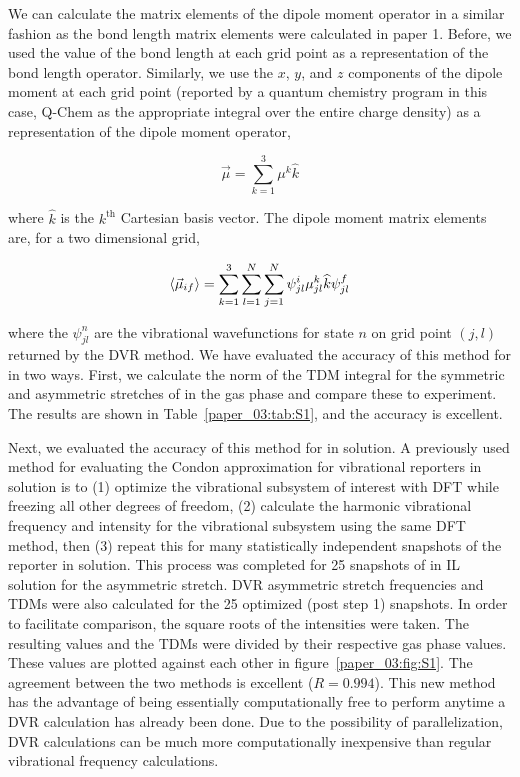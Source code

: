 We can calculate the matrix elements of the dipole moment operator in a similar fashion as the bond length matrix elements were calculated in paper 1. Before, we used the value of the bond length at each grid point as a representation of the bond length operator. Similarly, we use the \(x\), \(y\), and \(z\) components of the dipole moment at each grid point (reported by a quantum chemistry program \textemdash{} in this case, Q-Chem\cite{Shao2015} \textemdash{} as the appropriate integral over the entire charge density) as a representation of the dipole moment operator,

\begin{equation}
  \label{paper_03:eq:S2}
  \vec{\mu} = \sum_{k = 1}^{3} \mu^k \widehat{k}
\end{equation}

where \(\widehat{k}\) is the \(k^{\text{th}}\) Cartesian basis vector. The dipole moment matrix elements are, for a two dimensional grid,

\begin{equation}
  \label{paper_03:eq:S3}
  \Braket{ \vec{\mu}_{if} } = \sum_{k = 1}^{3} \sum_{l = 1}^{N} \sum_{j = 1}^{N} \psi_{jl}^{i} \mu_{jl}^{k} \widehat{k} \psi_{jl}^{f}
\end{equation}

where the \(\psi_{jl}^{n}\) are the vibrational wavefunctions for state \(n\) on grid point \((j,l)\) returned by the DVR method. We have evaluated the accuracy of this method for  in two ways. First, we calculate the norm of the TDM integral for the symmetric and asymmetric stretches of  in the gas phase and compare these to experiment.\cite{DOWNING197566} The results are shown in Table~\ref{paper_03:tab:S1}, and the accuracy is excellent.

Next, we evaluated the accuracy of this method for  in solution. A previously used method for evaluating the Condon approximation for vibrational reporters in solution is to (1) optimize the vibrational subsystem of interest with DFT while freezing all other degrees of freedom, (2) calculate the harmonic vibrational frequency and intensity for the vibrational subsystem using the same DFT method, then (3) repeat this for many statistically independent snapshots of the reporter in solution.\cite{schmidt_pronounced_2005-1} This process was completed for \num{25} snapshots of  in IL solution for the asymmetric stretch. DVR asymmetric stretch frequencies and TDMs were also calculated for the \num{25} optimized (post step 1) snapshots. In order to facilitate comparison, the square roots of the intensities were taken. The resulting values and the TDMs were divided by their respective gas phase values. These values are plotted against each other in figure~\ref{paper_03:fig:S1}. The agreement between the two methods is excellent (\(R = 0.994\)). This new method has the advantage of being essentially computationally free to perform anytime a DVR calculation has already been done. Due to the possibility of parallelization, DVR calculations can be much more computationally inexpensive than regular vibrational frequency calculations.

